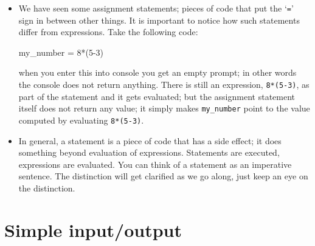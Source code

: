 \documentclass[a4paper]{article}
\begin{document}
\begin{itemize}
\item We have seen some assignment statements;  pieces of
code that put the `\Verb+=+' sign in between other things. It is important to
notice how such statements differ from expressions. Take the following code:


\begin{ucodeframe}
\begin{pyconsole}
my_number = 8*(5-3) 
\end{pyconsole}
\end{ucodeframe}

when you enter this into console you get an empty prompt; in other words the
console does not return anything. There is still an expression,
\Verb+8*(5-3)+, as part of the
statement and it gets evaluated; but the assignment statement itself
does not return any value; it simply makes \Verb+my_number+ point to the value
computed by evaluating \Verb+8*(5-3)+.

\item In general, a statement is a piece of code that has a side effect; it does
something beyond evaluation of expressions. Statements are executed, expressions
are evaluated. You can think of a statement as an imperative sentence. The distinction will get clarified as we go along, just keep an
eye on the distinction.

\end{itemize}

\section{Simple input/output}
\end{document}
